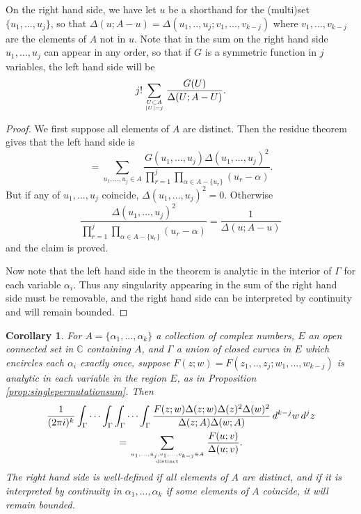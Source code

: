 \documentclass[12pt]{amsart}
\newtheorem{corollary}{Corollary}
\begin{document}
	On the right hand side, we have let $u$ be a shorthand for the (multi)set $\{u_1,...,u_j\}$, so that $\Delta(u;A-u) = \Delta(u_1,..,u_j; v_1,...,v_{k-j})$ where $v_1,..., v_{k-j}$ are the elements of $A$ not in $u$. Note that in the sum on the right hand side $u_1,...,u_j$ can appear in any order, so that if $G$ is a symmetric function in $j$ variables, the left hand side will be
	$$
	j! \sum_{U \subset A\atop |U| = j} \frac{G(U)}{\Delta(U; A-U)}.
	$$
	
	\begin{proof}
		We first suppose all elements of $A$ are distinct. Then the residue theorem gives that the left hand side is
		$$
		= \sum_{u_1,...,u_j \in A} \frac{G(u_1,...,u_j) \Delta(u_1,...,u_j)^2}{\prod_{r=1}^j \prod_{\alpha \in A - \{u_r\}} (u_r-\alpha)}.
		$$
		But if any of $u_1,...,u_j$ coincide, $\Delta(u_1,...,u_j)^2 = 0$. Otherwise
		$$
		\frac{\Delta(u_1,...,u_j)^2}{\prod_{r=1}^j \prod_{\alpha \in A - \{u_r\}} (u_r-\alpha)} = \frac{1}{\Delta(u;A-u)}
		$$
		and the claim is proved.
		
		Now note that the left hand side in the theorem is analytic in the interior of $\Gamma$ for each variable $\alpha_i$. Thus any singularity appearing in the sum of the right hand side must be removable, and the right hand side can be interpreted by continuity and will remain bounded.
	\end{proof}
	
	\begin{corollary}
		\label{cor:doublepermutationsum}
		For $A = \{\alpha_1,...,\alpha_k\}$ a collection of complex numbers, $E$ an open connected set in $\mathbb{C}$ containing $A$, and $\Gamma$ a union of closed curves in $E$ which encircles each $\alpha_i$ exactly once, suppose $F(z;w) = F(z_1,..,z_j; w_1,...,w_{k-j})$ is analytic in each variable in the region $E$, as in Proposition \ref{prop:singlepermutationsum}. Then
		\begin{multline}
			\label{eq:double_contours}
			\frac{1}{(2\pi i)^k} \int_\Gamma \cdots \int_\Gamma  \int_\Gamma \cdots \int_\Gamma \frac{F(z;w) \Delta(z;w) \Delta(z)^2 \Delta(w)^2}{\Delta(z;A) \Delta(w;A)} \, d^{k-j}w \, d^j z \\
			= \sum_{u_1,...,u_j, v_1, ..., v_{k-j} \in A \atop \textrm{distinct}} \frac{F(u;v)}{\Delta(u;v)}.
		\end{multline}
		The right hand side is well-defined if all elements of $A$ are distinct, and if it is interpreted by continuity in $\alpha_1,...,\alpha_k$ if some elements of $A$ coincide, it will remain bounded.
	\end{corollary}
	
\end{document}
